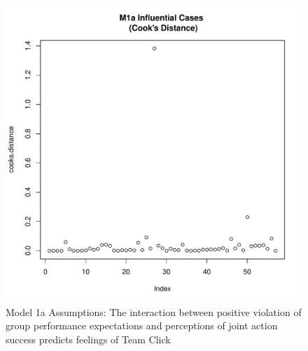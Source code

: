 \begin{figure}[htbp]
    \includegraphics[scale =.4]{images/TEM1aCooksD.pdf}
    \caption{Model 1a Assumptions: The interaction between positive violation of group performance expectations and perceptions of joint action success predicts feelings of Team Click}
    \label{fig:M1aAssumptions}
\end{figure}


